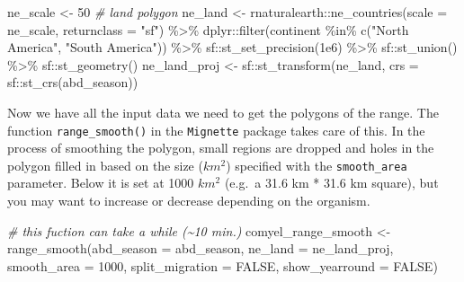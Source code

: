 \documentclass[
]{book}
\newenvironment{Shaded}{\begin{snugshade}}{\end{snugshade}}
\newcommand{\AttributeTok}[1]{\textcolor[rgb]{0.77,0.63,0.00}{#1}}
\newcommand{\CommentTok}[1]{\textcolor[rgb]{0.56,0.35,0.01}{\textit{#1}}}
\newcommand{\ConstantTok}[1]{\textcolor[rgb]{0.00,0.00,0.00}{#1}}
\newcommand{\DecValTok}[1]{\textcolor[rgb]{0.00,0.00,0.81}{#1}}
\newcommand{\FloatTok}[1]{\textcolor[rgb]{0.00,0.00,0.81}{#1}}
\newcommand{\FunctionTok}[1]{\textcolor[rgb]{0.00,0.00,0.00}{#1}}
\newcommand{\NormalTok}[1]{#1}
\newcommand{\OtherTok}[1]{\textcolor[rgb]{0.56,0.35,0.01}{#1}}
\newcommand{\SpecialCharTok}[1]{\textcolor[rgb]{0.00,0.00,0.00}{#1}}
\newcommand{\StringTok}[1]{\textcolor[rgb]{0.31,0.60,0.02}{#1}}
\begin{document}
\begin{Shaded}
\begin{Highlighting}[]
\NormalTok{ne\_scale }\OtherTok{\textless{}{-}} \DecValTok{50}
\CommentTok{\# land polygon}
\NormalTok{ne\_land }\OtherTok{\textless{}{-}}\NormalTok{ rnaturalearth}\SpecialCharTok{::}\FunctionTok{ne\_countries}\NormalTok{(}\AttributeTok{scale =}\NormalTok{ ne\_scale, }\AttributeTok{returnclass =} \StringTok{"sf"}\NormalTok{) }\SpecialCharTok{\%\textgreater{}\%}
\NormalTok{  dplyr}\SpecialCharTok{::}\FunctionTok{filter}\NormalTok{(continent }\SpecialCharTok{\%in\%} \FunctionTok{c}\NormalTok{(}\StringTok{"North America"}\NormalTok{, }\StringTok{"South America"}\NormalTok{)) }\SpecialCharTok{\%\textgreater{}\%}
\NormalTok{  sf}\SpecialCharTok{::}\FunctionTok{st\_set\_precision}\NormalTok{(}\FloatTok{1e6}\NormalTok{) }\SpecialCharTok{\%\textgreater{}\%}
\NormalTok{  sf}\SpecialCharTok{::}\FunctionTok{st\_union}\NormalTok{() }\SpecialCharTok{\%\textgreater{}\%} 
\NormalTok{  sf}\SpecialCharTok{::}\FunctionTok{st\_geometry}\NormalTok{()}
\NormalTok{ne\_land\_proj }\OtherTok{\textless{}{-}}\NormalTok{ sf}\SpecialCharTok{::}\FunctionTok{st\_transform}\NormalTok{(ne\_land, }\AttributeTok{crs =}\NormalTok{ sf}\SpecialCharTok{::}\FunctionTok{st\_crs}\NormalTok{(abd\_season))}
\end{Highlighting}
\end{Shaded}

Now we have all the input data we need to get the polygons of the range. The function \texttt{range\_smooth()} in the \texttt{Mignette} package takes care of this. In the process of smoothing the polygon, small regions are dropped and holes in the polygon filled in based on the size (\(km^2\)) specified with the \texttt{smooth\_area} parameter. Below it is set at 1000 \(km^2\) (e.g.~a 31.6 km * 31.6 km square), but you may want to increase or decrease depending on the organism.

\begin{Shaded}
\begin{Highlighting}[]
\CommentTok{\# this fuction can take a while (\textasciitilde{}10 min.)}
\NormalTok{comyel\_range\_smooth }\OtherTok{\textless{}{-}} \FunctionTok{range\_smooth}\NormalTok{(}\AttributeTok{abd\_season =}\NormalTok{ abd\_season, }
                                  \AttributeTok{ne\_land =}\NormalTok{ ne\_land\_proj,}
                                  \AttributeTok{smooth\_area =} \DecValTok{1000}\NormalTok{,}
                                  \AttributeTok{split\_migration =} \ConstantTok{FALSE}\NormalTok{, }
                                  \AttributeTok{show\_yearround =} \ConstantTok{FALSE}\NormalTok{)}
\end{Highlighting}
\end{Shaded}
\end{document}
